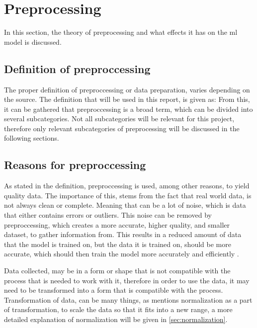 \section{Preprocessing}
In this section, the theory of preprocessing and what effects it has on the \gls{ml} model is discussed. 


\subsection{Definition of preproccessing}\label{subsec:preprocessing-definition}
The proper definition of preproccessing or data preparation, varies depending on the source. The definition that will be used in this report, is given as:
From this, it can be gathered that preproccessing is a broad term, which can be divided into several subcategories. Not all subcategories will be relevant for this project, therefore only relevant subcategories of preprocessing will be discussed in the following sections.

\subsection{Reasons for preproccessing}
As stated in the definition, preproccessing is used, among other reasons, to yield quality data. The importance of this, stems from the fact that real world data, is not always clean or complete. Meaning that can be a lot of noise, which is data that either contains errors or outliers. This noise can be removed by preproccessing, which creates a more accurate, higher quality, and smaller dataset, to gather information from. This results in a reduced amount of data that the model is trained on, but the data it is trained on, should be more accurate, which should then train the model more accurately and efficiently \cite{doi:10.1080/713827180}.

Data collected, may be in a form or shape that is not compatible with the process that is needed to work with it, therefore in order to use the data, it may need to be transformed into a form that is compatible with the process. Transformation of data, can be many things, as \cite{Data-preprocessing-for-flight-delays} mentions normalization as a part of transformation, to scale the data so that it fits into a new range, a more detailed explanation of normalization will be given in \ref{sec:normalization}.


